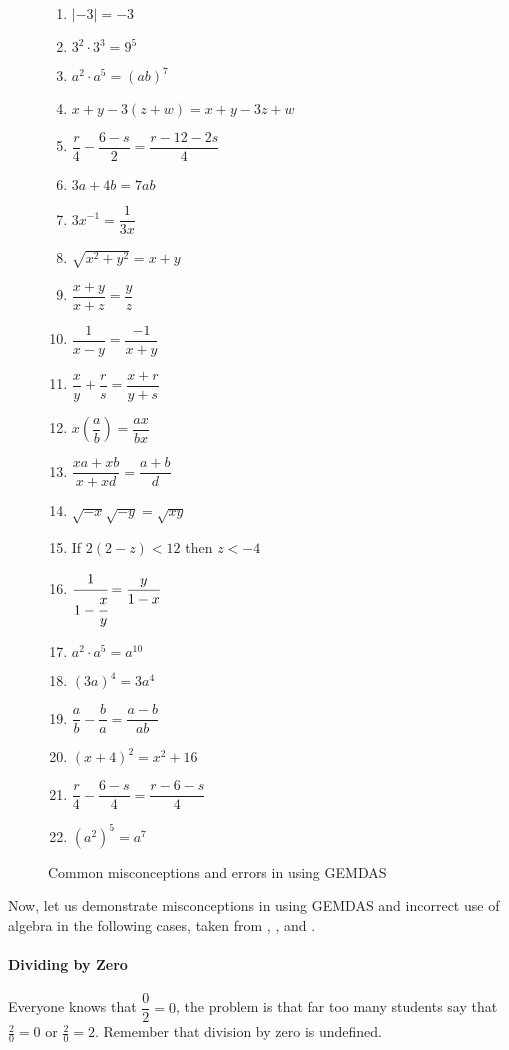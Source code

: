 \begin{figure}[!h]
\centering
\caption{Common misconceptions and errors in using GEMDAS}
\begin{multicols}{2}
\begin{enumerate}
\item $|-3|=-3$
\item $3^2\cdot 3^3=9^5$
\item $a^2\cdot a^5=(ab)^7$
\item $x+y-3(z+w)=x+y-3z+w$
\item $\dfrac{r}{4}-\dfrac{6-s}{2}=\dfrac{r-12-2s}{4}$
\item $3a+4b=7ab$
\item $3x^{-1}=\dfrac{1}{3x}$
\item $\sqrt{x^2+y^2}=x+y$
\item $\dfrac{x+y}{x+z}=\dfrac{y}{z}$
\item $\dfrac{1}{x-y}=\dfrac{-1}{x+y}$
\item $\dfrac{x}{y}+\dfrac{r}{s}=\dfrac{x+r}{y+s}$
\item $x\left(\dfrac{a}{b}\right)=\dfrac{ax}{bx}$
\item $\dfrac{xa+xb}{x+xd}=\dfrac{a+b}{d}$
\item $\sqrt{-x}\sqrt{-y}=\sqrt{xy}$
\item If $2(2-z)<12$ then $z<-4$
\item $\cfrac{1}{1-\cfrac{x}{y}}=\dfrac{y}{1-x}$
\item $a^2\cdot a^5=a^{10}$
\item $(3a)^4=3a^4$
\item $\dfrac{a}{b}-\dfrac{b}{a}=\dfrac{a-b}{ab}$
\item $(x+4)^2=x^2+16$
\item $\dfrac{r}{4}-\dfrac{6-s}{4}=\dfrac{r-6-s}{4}$
\item $(a^2)^5=a^7$
\end{enumerate}
\end{multicols}
\label{chap4fig:1}
\end{figure}
Now, let us demonstrate misconceptions in using GEMDAS and incorrect use of algebra in the
following cases, taken from \textcite{larson}, \textcite{common}, \textcite{dawkins2} and \textcite{merlin}.
\paragraph*{Dividing by Zero} Everyone knows that $\dfrac{0}{2}=0$, the problem is that far too many students say that
$\frac{2}{0}=0$ or $\frac{2}{0}=2$. Remember that division by zero is undefined.
